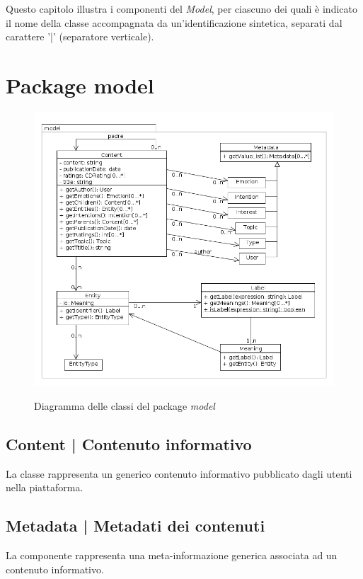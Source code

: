 \documentclass[10pt,a4paper,headinclude,footinclude,hidelinks]{scrreprt} %
\begin{document}
	Questo capitolo illustra i componenti del \textit{Model}, per ciascuno dei quali è indicato il nome della classe accompagnata da un'identificazione sintetica, separati dal carattere '|' (separatore verticale).

	\section{Package model}
	\label{sec:stage:design:model}

	\begin{figure}[ht]
		\begin{center}
	    	\includegraphics[width=12cm]{class/model.png}
			\label{gfx:class:model}
			\caption{Diagramma delle classi del package \textit{model}}
		\end{center}
	\end{figure}

	\subsection[Content]{Content | Contenuto informativo}
	\label{sec:stage:design:model:content}
	La classe \textit{} rappresenta un generico contenuto informativo pubblicato dagli utenti nella piattaforma.

	\subsection[Metadata]{Metadata | Metadati dei contenuti}
	\label{sec:stage:design:model:metadata}
	La componente \textit{} rappresenta una meta-informazione generica associata ad un contenuto informativo.
\end{document}
